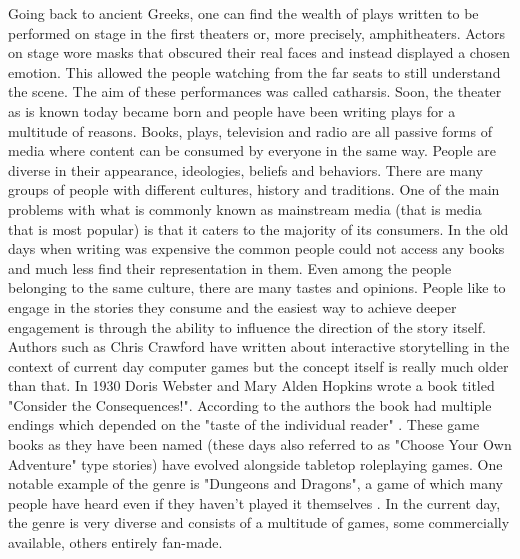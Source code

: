 Going back to ancient Greeks, one can find the wealth of plays written to be performed on stage in the first theaters or, more precisely, amphitheaters.
Actors on stage wore masks that obscured their real faces and instead displayed a chosen emotion.
This allowed the people watching from the far seats to still understand the scene.
The aim of these performances was called catharsis\cite{hart2010art}.
Soon, the theater as is known today became born and people have been writing plays for a multitude of reasons.
Books, plays, television and radio are all passive forms of media where content can be consumed by everyone in the same way.
People are diverse in their appearance, ideologies, beliefs and behaviors.
There are many groups of people with different cultures, history and traditions.
One of the main problems with what is commonly known as mainstream media (that is media that is most popular) is that it caters to the majority of its consumers.
In the old days when writing was expensive the common people could not access any books and much less find their representation in them.
Even among the people belonging to the same culture, there are many tastes and opinions.
People like to engage in the stories they consume and the easiest way to achieve deeper engagement is through the ability to influence the direction of the story itself.
Authors such as Chris Crawford\cite{crawford2013interactive} have written about interactive storytelling in the context of current day computer games but the concept itself is really much older than that.
In 1930 Doris Webster and Mary Alden Hopkins wrote a book titled "Consider the Consequences!".
According to the authors the book had multiple endings which depended on the "taste of the individual reader" \cite{webster1930consequences}.
These game books as they have been named (these days also referred to as "Choose Your Own Adventure" type stories\cite{kraft1981cyoa}) have evolved alongside tabletop roleplaying games.
One notable example of the genre is "Dungeons and Dragons", a game of which many people have heard even if they haven't played it themselves \cite{gygax1974dungeons}.
In the current day, the genre is very diverse and consists of a multitude of games, some commercially available, others entirely fan-made.

